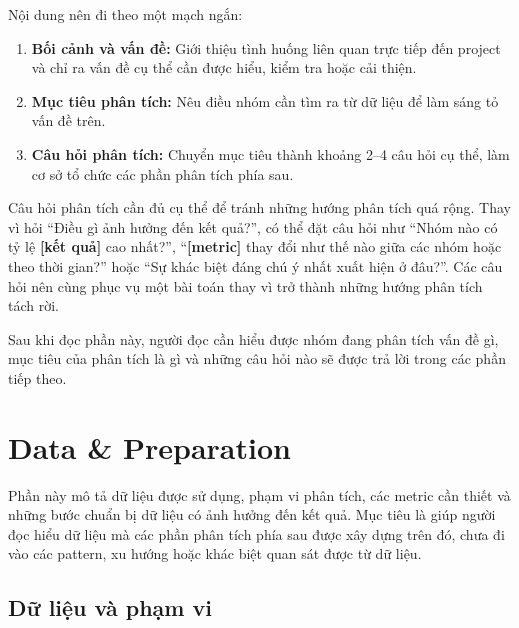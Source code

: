 \documentclass[12pt]{eDA_conquer2026}
\begin{document}
Nội dung nên đi theo một mạch ngắn:

\begin{enumerate}
    \item \textbf{Bối cảnh và vấn đề:} Giới thiệu tình huống liên quan trực tiếp đến project và chỉ ra vấn đề cụ thể cần được hiểu, kiểm tra hoặc cải thiện.
    
    \item \textbf{Mục tiêu phân tích:} Nêu điều nhóm cần tìm ra từ dữ liệu để làm sáng tỏ vấn đề trên.
    
    \item \textbf{Câu hỏi phân tích:} Chuyển mục tiêu thành khoảng 2--4 câu hỏi cụ thể, làm cơ sở tổ chức các phần phân tích phía sau.
\end{enumerate}

Câu hỏi phân tích cần đủ cụ thể để tránh những hướng phân tích quá rộng. Thay vì hỏi ``Điều gì ảnh hưởng đến kết quả?'', có thể đặt câu hỏi như ``Nhóm nào có tỷ lệ \textbf{[kết quả]} cao nhất?'', ``\textbf{[metric]} thay đổi như thế nào giữa các nhóm hoặc theo thời gian?'' hoặc ``Sự khác biệt đáng chú ý nhất xuất hiện ở đâu?''. Các câu hỏi nên cùng phục vụ một bài toán thay vì trở thành những hướng phân tích tách rời.

\begin{aivncodebox}
Sau khi đọc phần này, người đọc cần hiểu được nhóm đang phân tích vấn đề gì, mục tiêu của phân tích là gì và những câu hỏi nào sẽ được trả lời trong các phần tiếp theo.
\end{aivncodebox}

\newpage


\setcounter{tocdepth}{2}
\tableofcontents
\thispagestyle{fancy}

\newpage
\section{Data \& Preparation}

Phần này mô tả dữ liệu được sử dụng, phạm vi phân tích, các metric cần thiết và những bước chuẩn bị dữ liệu có ảnh hưởng đến kết quả. Mục tiêu là giúp người đọc hiểu dữ liệu mà các phần phân tích phía sau được xây dựng trên đó, chưa đi vào các pattern, xu hướng hoặc khác biệt quan sát được từ dữ liệu.

\subsection*{Dữ liệu và phạm vi}
\end{document}
